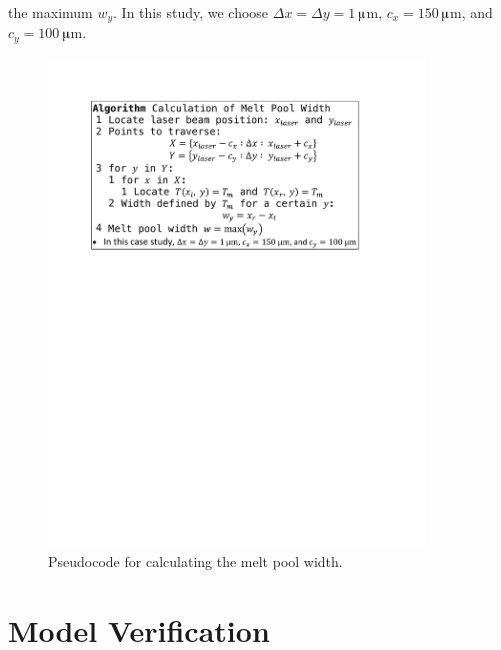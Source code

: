 \documentclass [11pt, proquest] {uwthesis}[2020/02/24]
\begin{document}
the maximum $w_{y}$. In this study, we choose $\Delta x=\Delta y=1\,$$\muup$m,
$c_{x}=150\,$$\muup$m, and $c_{y}=100\,$$\muup$m.
\begin{figure}[!ht]
\begin{centering}
\includegraphics[clip,width=10cm]{Closed-loop-simulation/pseudocode_mpw}
\par\end{centering}
\centering{}\caption{\label{fig:Pseudocode-for-calculating}Pseudocode for calculating
the melt pool width.}
\end{figure}

\section{Model Verification} \label{sec:Model-Verification}
\end{document}
